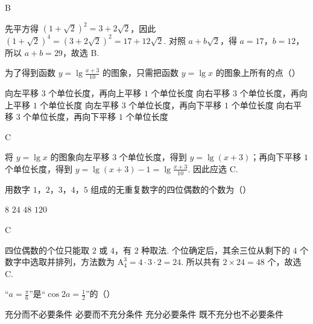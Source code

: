 \begin{answer}
B
\end{answer}

\begin{solution}
先平方得 \(\left(1+\sqrt{2}\right)^2=3+2\sqrt{2}\)，因此 \(\left(1+\sqrt{2}\right)^4=\left(3+2\sqrt{2}\right)^2=17+12\sqrt{2}\). 对照 \(a+b\sqrt{2}\)，得 \(a=17\)，\(b=12\)，所以 \(a+b=29\)，故选 B.
\end{solution}

\begin{problem}
为了得到函数 \( y = \lg \frac{x + 3}{10} \) 的图象，只需把函数 \( y = \lg x \) 的图象上所有的点（\quad）

\choices
    {向左平移 \(3\) 个单位长度，再向上平移 \(1\) 个单位长度}
    {向右平移 \(3\) 个单位长度，再向上平移 \(1\) 个单位长度}
    {向左平移 \(3\) 个单位长度，再向下平移 \(1\) 个单位长度}
    {向右平移 \(3\) 个单位长度，再向下平移 \(1\) 个单位长度}
\end{problem}

\begin{answer}
C
\end{answer}

\begin{solution}
将 \(y=\lg x\) 的图象向左平移 \(3\) 个单位长度，得到 \(y=\lg(x+3)\)；再向下平移 \(1\) 个单位长度，得到 \(y=\lg(x+3)-1=\lg\frac{x+3}{10}\). 因此应选 C.
\end{solution}

\begin{problem}
用数字 \(1\)，\(2\)，\(3\)，\(4\)，\(5\) 组成的无重复数字的四位偶数的个数为（\quad）

\choices
    {\(8\)}
    {\(24\)}
    {\(48\)}
    {\(120\)}
\end{problem}

\begin{answer}
C
\end{answer}

\begin{solution}
四位偶数的个位只能取 \(2\) 或 \(4\)，有 \(2\) 种取法. 个位确定后，其余三位从剩下的 \(4\) 个数字中选取并排列，方法数为 \(\mathrm A_4^3=4\cdot3\cdot2=24\). 所以共有 \(2\times24=48\) 个，故选 C.
\end{solution}

\begin{problem}
“\(a=\frac{\pi}{6}\)”是“\(\cos2a=\frac{1}{2}\)”的（\quad）

\choices
    {充分而不必要条件}
    {必要而不充分条件}
    {充分必要条件}
    {既不充分也不必要条件}
\end{problem}


